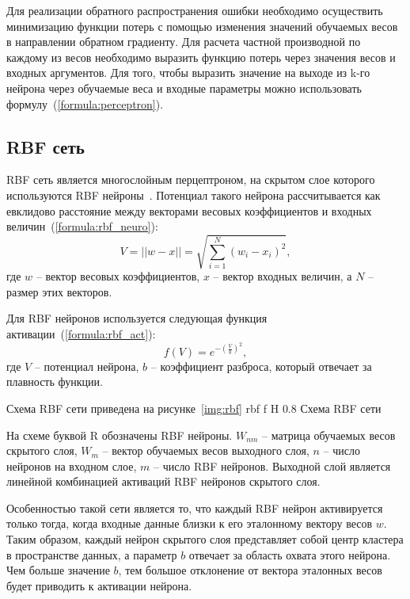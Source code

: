 Для реализации обратного распространения ошибки необходимо осуществить минимизацию функции потерь с помощью изменения значений обучаемых весов в направлении обратном градиенту.
Для расчета частной производной по каждому из весов необходимо выразить функцию потерь через значения весов и входных аргументов.
Для того, чтобы выразить значение на выходе из k-го нейрона через обучаемые веса и входные параметры можно использовать формулу~(\ref{formula:perceptron}).

\subsection{RBF сеть}
RBF сеть является многослойным перцептроном, на скрытом слое которого используются RBF нейроны~\cite{jiang2022efficient}.
Потенциал такого нейрона рассчитывается как евклидово расстояние между векторами весовых коэффициентов и входных величин~(\ref{formula:rbf_neuro}):
\begin{equation}\label{formula:rbf_neuro}
	V = ||w - x|| = \sqrt{\sum_{i=1}^{N}(w_i-x_i)^2},
\end{equation}
где $w$ -- вектор весовых коэффициентов, $x$ -- вектор входных величин, а $N$ -- размер этих векторов.

Для RBF нейронов используется следующая функция активации~(\ref{formula:rbf_act}):
\begin{equation}\label{formula:rbf_act}
	f(V) = e^{-(\frac{V}{b})^2},
\end{equation}
где $V$ -- потенциал нейрона, $b$ -- коэффициент разброса, который отвечает за плавность функции.

Схема RBF сети приведена на рисунке~\ref{img:rbf}
{rbf} %
{f} %
{H} %
{0.8\textwidth} %
{Схема RBF сети} %

На схеме буквой R обозначены RBF нейроны. $W_{nm}$ -- матрица обучаемых весов скрытого слоя, $W_m$ -- вектор обучаемых весов выходного слоя, $n$ -- число нейронов на входном слое, $m$ -- число RBF нейронов.
Выходной слой является линейной комбинацией активаций RBF нейронов скрытого слоя.

Особенностью такой сети является то, что каждый RBF нейрон активируется только тогда, когда входные данные близки к его эталонному вектору весов $w$.
Таким образом, каждый нейрон скрытого слоя представляет собой центр кластера в пространстве данных, а параметр $b$ отвечает за область охвата этого нейрона.
Чем больше значение $b$, тем большое отклонение от вектора эталонных весов будет приводить к активации нейрона.


